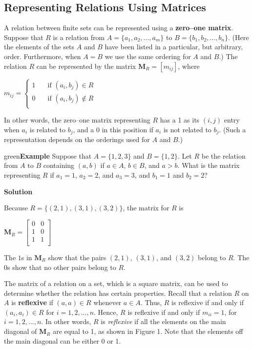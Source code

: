 \documentclass[11pt]{article}
\newenvironment{example}[1][\unskip]{\begin{mybox}{green}{\textbf{Example} {#1}}}{\end{mybox}}
\begin{document}
\subsection{Representing Relations Using Matrices}

A relation between finite sets can be represented using a \textbf{zero–one matrix}. Suppose that $R$ is a relation from $A = \{a_1, a_2, ..., a_m\}$ to $B = \{b_1, b_2, ..., b_n\}$. (Here the elements of the sets $A$ and $B$ have been listed in a particular, but arbitrary, order. Furthermore, when $A = B$ we use the
same ordering for $A$ and $B$.) The relation $R$ can be represented by the matrix $\textbf{M}_R = [m_{ij}]$, where

$ m_{ij} = 
    \begin{cases}
       1 &\quad\text{if } (a_i, b_j) \in R\\
       0 &\quad\text{if } (a_i, b_j) \notin R\\
    \end{cases}$

\noindent In other words, the zero–one matrix representing $R$ has a 1 as its $(i, j)$ entry when $a_i$ is related to $b_j$, and a 0 in this position if $a_i$ is not related to $b_j$. (Such a representation depends on the orderings used for $A$ and $B$.)

\begin{example}
Suppose that $A = \{1, 2, 3\}$ and $B = \{1, 2\}$. Let $R$ be the relation from $A$ to $B$ containing $(a, b)$ if $a \in A$, $b \in B$, and $a > b$. What is the matrix representing $R$ if $a_1 = 1$, $a_2 = 2$, and $a_3 = 3$, and $b_1 = 1$ and $b_2 = 2$?

\textbf{Solution}

Because $R = \{(2, 1), (3, 1), (3, 2)\}$, the matrix for $R$ is

$\textbf{M}_R =
    \begin{bmatrix}
    0 & 0\\
    1 & 0\\
    1 & 1\\
    \end{bmatrix}$

The $1$s in $\textbf{M}_R$ show that the pairs $(2, 1)$, $(3, 1)$, and $(3, 2)$ belong to $R$. The $0$s show that no other pairs belong to $R$.
\end{example}


The matrix of a relation on a set, which is a square matrix, can be used to determine whether the relation has certain properties. Recall that a relation $R$ on $A$ is \textbf{reflexive} if $(a, a) \in R$ whenever $a \in A$. Thus, $R$ is reflexive if and only if $(a_i, a_i) \in R$ for $i = 1, 2, ..., n$. Hence, $R$ is reflexive if and only if $m_{ii} = 1$, for $i = 1, 2, ..., n$. In other words, $R$ is \textit{reflexive} if all the elements on the main diagonal of $\textbf{M}_R$ are equal to 1, as shown in Figure 1. Note that the elements off the main diagonal can be either 0 or 1.
\end{document}
